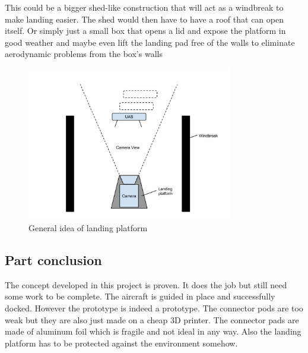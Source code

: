 This could be a bigger shed-like construction that will act as a windbreak to make landing easier. The shed would then have to have a roof that can open itself. Or simply just a small box that opens a lid and expose the platform in good weather and maybe even lift the landing pad free of the walls to eliminate aerodynamic problems from the box's walls

\begin{figure}
	\centering
	\includegraphics[width=0.8\textwidth]{imgs/landing_platform}
	\caption{General idea of landing platform}
\end{figure}

\subsection{Part conclusion}
The concept developed in this project is proven. It does the job but still need some work to be complete. The aircraft is guided in place and successfully docked. However the prototype is indeed a prototype. The connector pods are too weak but they are also just made on a cheap 3D printer. The connector pads are made of aluminum foil which is fragile and not ideal in any way. Also the landing platform has to be protected against the environment somehow. 